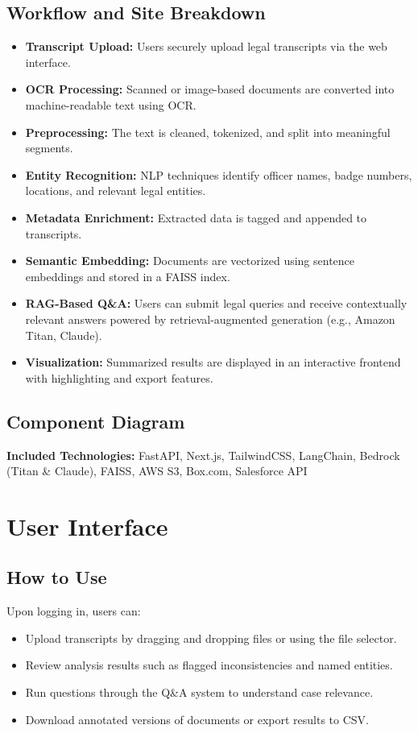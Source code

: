 \documentclass[11pt]{article}
\begin{document}
\subsection{Workflow and Site Breakdown}
\begin{itemize}
\item \textbf{Transcript Upload:} Users securely upload legal transcripts via the web interface.
\item \textbf{OCR Processing:} Scanned or image-based documents are converted into machine-readable text using OCR.
\item \textbf{Preprocessing:} The text is cleaned, tokenized, and split into meaningful segments.
\item \textbf{Entity Recognition:} NLP techniques identify officer names, badge numbers, locations, and relevant legal entities.
\item \textbf{Metadata Enrichment:} Extracted data is tagged and appended to transcripts.
\item \textbf{Semantic Embedding:} Documents are vectorized using sentence embeddings and stored in a FAISS index.
\item \textbf{RAG-Based Q\&A:} Users can submit legal queries and receive contextually relevant answers powered by retrieval-augmented generation (e.g., Amazon Titan, Claude).
\item \textbf{Visualization:} Summarized results are displayed in an interactive frontend with highlighting and export features.
\end{itemize}

\subsection{Component Diagram}
\textbf{Included Technologies:}  
FastAPI, Next.js, TailwindCSS, LangChain, Bedrock (Titan \& Claude), FAISS, AWS S3, Box.com, Salesforce API

\newpage
\section{User Interface}
\subsection{How to Use}
Upon logging in, users can:
\begin{itemize}
\item Upload transcripts by dragging and dropping files or using the file selector.
\item Review analysis results such as flagged inconsistencies and named entities.
\item Run questions through the Q\&A system to understand case relevance.
\item Download annotated versions of documents or export results to CSV.
\end{itemize}
\end{document}
